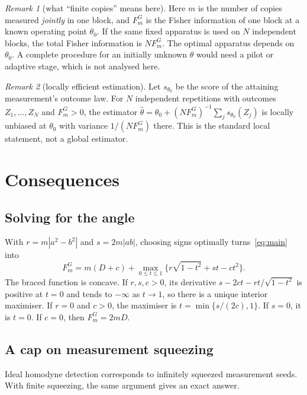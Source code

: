 \documentclass[11pt,a4paper]{article}
\theoremstyle{definition}\newtheorem{definition}{Definition}
\theoremstyle{remark}\newtheorem{remark}{Remark}
\begin{document}
\begin{remark}[what ``finite copies'' means here]
Here $m$ is the number of copies measured \emph{jointly} in one block, and $F_m^G$ is the Fisher information of one block at a known operating point $\theta_0$. If the same fixed apparatus is used on $N$ independent blocks, the total Fisher information is $NF_m^G$. The optimal apparatus depends on $\theta_0$. A complete procedure for an initially unknown $\theta$ would need a pilot or adaptive stage, which is not analysed here.
\end{remark}

\begin{remark}[locally efficient estimation]
Let $s_{\theta_0}$ be the score of the attaining measurement's outcome law. For $N$ independent repetitions with outcomes $Z_1,\dots,Z_N$ and $F_m^G>0$, the estimator $\hat\theta=\theta_0+(NF_m^G)^{-1}\sum_js_{\theta_0}(Z_j)$ is locally unbiased at $\theta_0$ with variance $1/(NF_m^G)$ there. This is the standard local statement, not a global estimator.
\end{remark}

\section{Consequences}\label{sec:consequences}

\subsection{Solving for the angle}
With $r=m|a^2-b^2|$ and $s=2m|ab|$, choosing signs optimally turns~\eqref{eq:main} into
\begin{equation}\label{eq:scalar}
F_m^G=m(D+c)+\max_{0\le t\le1}\big\{r\sqrt{1-t^2}+st-ct^2\big\}.
\end{equation}
The braced function is concave. If $r,s,c>0$, its derivative $s-2ct-rt/\sqrt{1-t^2}$ is positive at $t=0$ and tends to $-\infty$ as $t\to1$, so there is a unique interior maximiser. If $r=0$ and $c>0$, the maximiser is $t=\min\{s/(2c),1\}$. If $s=0$, it is $t=0$. If $c=0$, then $F_m^G=2mD$.

\subsection{A cap on measurement squeezing}

Ideal homodyne detection corresponds to infinitely squeezed measurement seeds. With finite squeezing, the same argument gives an exact answer.
\end{document}
